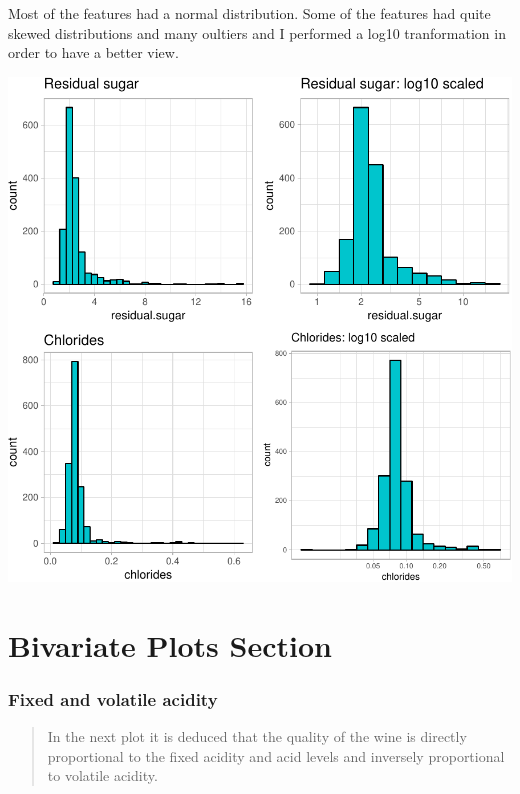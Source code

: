 \documentclass[]{article}
\begin{document}
Most of the features had a normal distribution. Some of the features had
quite skewed distributions and many oultiers and I performed a log10
tranformation in order to have a better view.

\includegraphics{Figs/univariate_tranformation-1.pdf}

\section{Bivariate Plots Section}\label{bivariate-plots-section}

\subsubsection{Fixed and volatile
acidity}\label{fixed-and-volatile-acidity-1}

\begin{quote}
In the next plot it is deduced that the quality of the wine is directly
proportional to the fixed acidity and acid levels and inversely
proportional to volatile acidity.
\end{quote}
\end{document}
